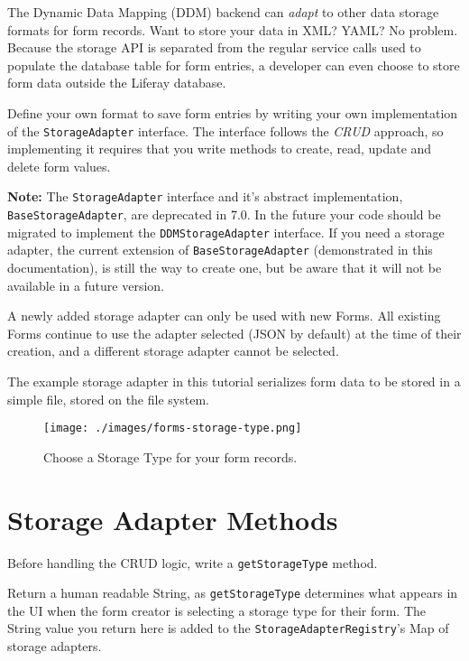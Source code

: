The Dynamic Data Mapping (DDM) backend can \emph{adapt} to other data
storage formats for form records. Want to store your data in XML? YAML?
No problem. Because the storage API is separated from the regular
service calls used to populate the database table for form entries, a
developer can even choose to store form data outside the Liferay
database.

Define your own format to save form entries by writing your own
implementation of the \texttt{StorageAdapter} interface. The interface
follows the \emph{CRUD} approach, so implementing it requires that you
write methods to create, read, update and delete form values.

\noindent\hrulefill

\textbf{Note:} The \texttt{StorageAdapter} interface and it's abstract
implementation, \textbar{} \texttt{BaseStorageAdapter}, are deprecated
in 7.0. In the future your code should be migrated to implement the
\texttt{DDMStorageAdapter} interface. If you need a storage adapter, the
current extension of \texttt{BaseStorageAdapter} (demonstrated in this
documentation), is still the way to create one, but be aware that it
will not be available in a future version.

\noindent\hrulefill

A newly added storage adapter can only be used with new Forms. All
existing Forms continue to use the adapter selected (JSON by default) at
the time of their creation, and a different storage adapter cannot be
selected.

The example storage adapter in this tutorial serializes form data to be
stored in a simple file, stored on the file system.

\begin{figure}
\centering
\texttt{[image: ./images/forms-storage-type.png]}
\caption{Choose a Storage Type for your form records.}
\end{figure}

\section{Storage Adapter Methods}\label{storage-adapter-methods}

Before handling the CRUD logic, write a \texttt{getStorageType} method.

\begin{description}
\tightlist
\item[\texttt{getStorageType}]
Return a human readable String, as \texttt{getStorageType} determines
what appears in the UI when the form creator is selecting a storage type
for their form. The String value you return here is added to the
\texttt{StorageAdapterRegistry}'s Map of storage adapters.
\end{description}

